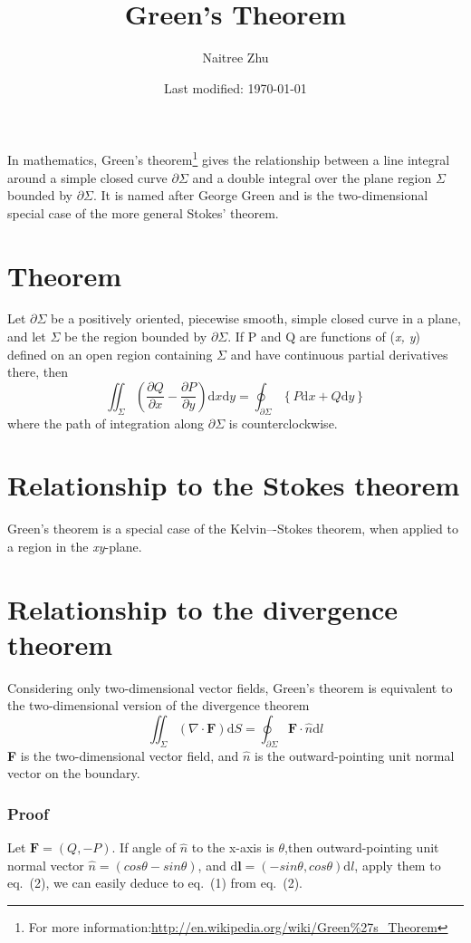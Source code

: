 \documentclass[a4paper]{article}
\title{Green's Theorem}
\author{Naitree Zhu}
\date{Last modified: \today}
\begin{document}
\maketitle
In mathematics, Green's theorem\footnote{For more information:\url{http://en.wikipedia.org/wiki/Green\%27s_Theorem}} gives the relationship between a line integral around a simple closed curve $\partial\Sigma$ and a double integral over the plane region $\Sigma$ bounded by $\partial\Sigma$. It is named after George Green and is the two-dimensional special case of the more general Stokes' theorem.
\part{Theorem}
Let $\partial\Sigma$ be a positively oriented, piecewise smooth, simple closed curve in a plane, and let $\Sigma$ be the region bounded by $\partial\Sigma$. If P and Q are functions of (\textit{x, y}) defined on an open region containing $\Sigma$ and have continuous partial derivatives there, then
\begin{equation}
\iint_\Sigma \left(\frac{\partial Q}{\partial x}-\frac{\partial P}{\partial y}\right)\mathrm{d}x
\mathrm{d}y=\oint_{\partial\Sigma} \left\lbrace P\mathrm{d}x+Q\mathrm{d}y\right\rbrace
\end{equation}
where the path of integration along $\partial\Sigma$ is counterclockwise.
\part{Relationship to the Stokes theorem}
Green's theorem is a special case of the Kelvin–-Stokes theorem, when applied to a region in the \textit{xy}-plane.
\part{Relationship to the divergence theorem}
Considering only two-dimensional vector fields, Green's theorem is equivalent to the two-dimensional version of the divergence theorem
\begin{equation}
\iint_\Sigma\left(\nabla\cdot\boldsymbol{F}\right)\mathrm{d}S=\oint_{\partial\Sigma}\boldsymbol{F}\cdot\hat{n}\mathrm{d}l
\end{equation}
\textbf{F} is the two-dimensional vector field, and $\hat{n}$ is the outward-pointing unit normal vector on the boundary.
\section*{Proof}
Let $\boldsymbol{F}=(Q,-P)$. If angle of $\hat{n}$ to the x-axis is $\theta$,then outward-pointing unit normal vector $\hat{n}=(cos\theta-sin\theta)$, and $\mathrm{d}\boldsymbol{l}=(-sin\theta,cos\theta)\mathrm{d}l$, apply them to eq.~(2), we can easily deduce to eq.~(1) from eq.~(2).
\end{document}

